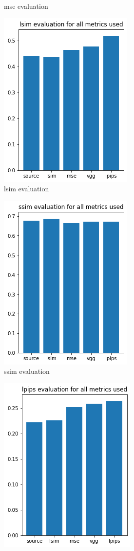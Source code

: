 \documentclass[a4paper,12pt,twoside]{report}
\begin{document}
\begin{figure}
\begin{subfigure}{0.49\textwidth}
  \caption{mse evaluation}
\end{subfigure}
\begin{subfigure}{0.49\textwidth}
  \centering
  \includegraphics[scale=0.4]{buoyancy/lsim.png}
  \caption{lsim evaluation}
\end{subfigure}
\begin{subfigure}{0.49\textwidth}
  \centering
  \includegraphics[scale=0.4]{buoyancy/ssim.png}
  \caption{ssim evaluation}
\end{subfigure}
\begin{subfigure}{0.49\textwidth}
  \centering
  \includegraphics[scale=0.4]{buoyancy/lpips.png}

\end{subfigure}
\end{figure}
\end{document}
